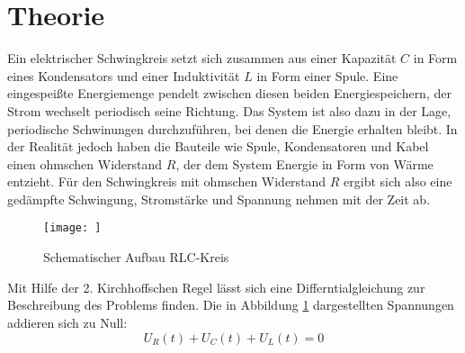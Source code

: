 \section{Theorie}
\label{sec:Theorie}

Ein elektrischer Schwingkreis setzt sich zusammen aus einer Kapazität $C$ in Form eines Kondensators und einer Induktivität $L$ in Form einer Spule.
Eine eingespeißte Energiemenge pendelt zwischen diesen beiden Energiespeichern, der Strom wechselt periodisch seine Richtung.
Das System ist also dazu in der Lage, periodische Schwinungen durchzuführen, bei denen die Energie erhalten bleibt.
In der Realität jedoch haben die Bauteile wie Spule, Kondensatoren und Kabel einen ohmschen Widerstand $R$, der dem System Energie in Form von Wärme entzieht.
Für den Schwingkreis mit ohmschen Widerstand $R$ ergibt sich also eine gedämpfte Schwingung, Stromstärke und Spannung nehmen mit der Zeit ab.
\begin{figure}
  \centering
  \texttt{[image: ]}
  \caption{Schematischer Aufbau RLC-Kreis}
  \label{fig:abb1}
\end{figure}
Mit Hilfe der 2. Kirchhoffschen Regel lässt sich eine Differntialgleichung zur Beschreibung des Problems finden.
Die in Abbildung \ref{fig:abb1} dargestellten Spannungen addieren sich zu Null:
\begin{equation}
  U_R(t) + U_C(t) + U_L(t)  = 0
  \label{eqn:gl1}
\end{equation}
